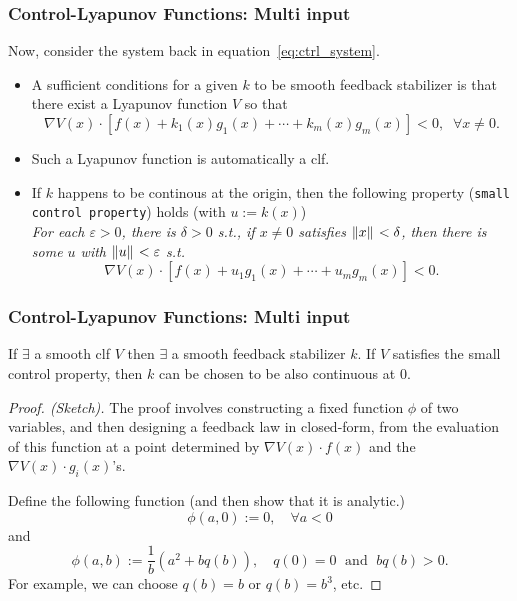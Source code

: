 \begin{frame}
    \frametitle{Control-Lyapunov Functions: Multi input}

    Now, consider the system back in equation~\eqref{eq:ctrl_system}. 
    
    \begin{itemize}
        \item A sufficient conditions for a given $k$ to be smooth feedback
        stabilizer is that there exist a Lyapunov function $V$ so that \[ \nabla
        V(x) \cdot \left[ f(x) + k_1(x)g_1(x) + \cdots + k_m(x)g_m(x) \right] <
        0, \;\; \forall x \neq 0. \] 
        \item Such a Lyapunov function is automatically a clf.
        \item If $k$ happens to be continous at the origin, then the following
        property (\texttt{small control property}) holds (with $u := k(x)$) \\
        \textit{
            For each $\varepsilon > 0$, there is $\delta > 0$ s.t., if $x \neq 0$ 
            satisfies $\|{x}\|_{{}_{}} < \delta$, then there is some 
            $u$ with $\|{u}\|_{{}_{}} < \varepsilon$ s.t.
            \[\nabla V(x) \cdot \left[ f(x) + u_1g_1(x) + \cdots + u_mg_m(x) 
            \right] < 0. \]
        }
    \end{itemize}
\end{frame}


\begin{frame}
    \frametitle{Control-Lyapunov Functions: Multi input}

    \begin{theorem}
        If $\exists$ a smooth clf $V$ then $\exists$ a smooth feedback
        stabilizer $k$. If $V$ satisfies the small control property, then $k$ 
        can be chosen to be also continuous at $0$.
    \end{theorem}

    \begin{proof}[Proof. (Sketch)]
        The proof involves constructing a fixed function $\phi$ of two
        variables, and then designing a feedback law in closed-form, from the
        evaluation of this function at a point determined by $\nabla V(x) \cdot
        f(x)$ and the $\nabla V(x) \cdot g_i(x)$'s.

        Define the following function (and then show that it is analytic.)
        \[ \phi(a, 0) := 0, \quad \forall a < 0 \] and \[ \phi(a,b) :=
        \frac{1}{b}\left( a^2 + bq(b) \right), \quad q(0) = 0 \; \text{ and } \;
        bq(b) > 0. \]
        For example, we can choose $q(b) = b$ or $q(b) = b^3$, etc.
    \end{proof}
\end{frame}


